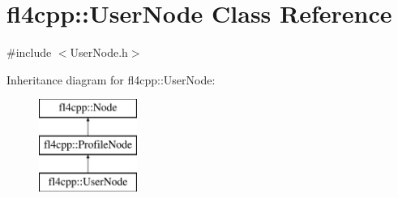 \hypertarget{classfl4cpp_1_1_user_node}{}\section{fl4cpp\+:\+:User\+Node Class Reference}
\label{classfl4cpp_1_1_user_node}


{\ttfamily \#include $<$User\+Node.\+h$>$}

Inheritance diagram for fl4cpp\+:\+:User\+Node\+:\begin{figure}[H]
\begin{center}
\leavevmode
\includegraphics[height=3.000000cm]{classfl4cpp_1_1_user_node}
\end{center}
\end{figure}
